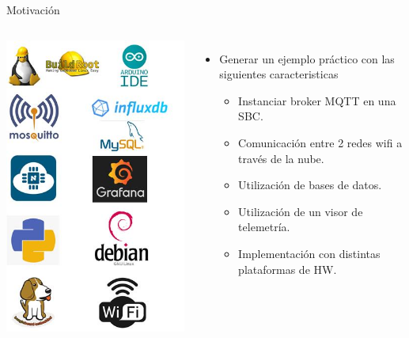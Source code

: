 \documentclass[aspectratio= 43]{beamer}
\begin{document}
\begin{frame}{Motivación}
   \begin{columns}
      \includegraphics [width=\textwidth]{./visio/Filmina_2.jpg}
      \begin{itemize}
       \item{Generar un ejemplo práctico con las siguientes caracteristicas}
      \begin{itemize}
                 \item{Instanciar broker MQTT en una SBC.}
	         \item{Comunicación entre 2 redes wifi a través de la nube.}
	         \item{Utilización de bases de datos.}
	         \item{Utilización de un visor de telemetría.}
	         \item{Implementación con distintas plataformas de HW.}
      \end{itemize}
      \end{itemize}
   \end{columns}
\end{frame}
\end{document}
